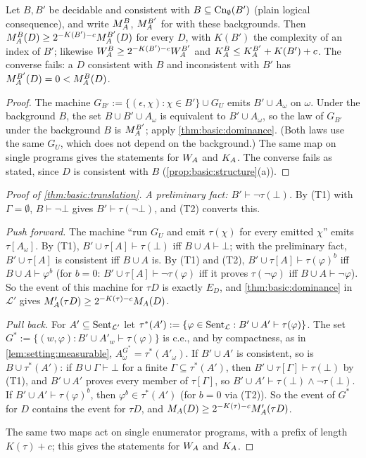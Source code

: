\begin{proposition}\label{prop:basic:background}
Let $B,B'$ be decidable and consistent with $B\subseteq\mathrm{Cn}_\emptyset(B')$ (plain logical consequence), and write $M_{A}^B$, $M_{A}^{B'}$ for \SAIabbr with these backgrounds. Then $M_{A}^B(D)\ge2^{-K(B')-c}M_{A}^{B'}(D)$ for every $D$, with $K(B')$ the complexity of an index of $B'$; likewise $W_{A}^B\ge2^{-K(B')-c}W_{A}^{B'}$ and $K_{A}^B\le K_{A}^{B'}+K(B')+c$. The converse fails: a $D$ consistent with $B$ and inconsistent with $B'$ has $M_{A}^{B'}(D)=0<M_{A}^B(D)$.
\end{proposition}

\begin{proof}
The machine $G_{B'}:=\{(\epsilon,\chi):\chi\in B'\}\cup G_U$ emits $B'\cup A_\omega$ on $\omega$. Under the background $B$, the set $B\cup B'\cup A_\omega$ is equivalent to $B'\cup A_\omega$, so the law of $G_{B'}$ under the background $B$ is $M_{A}^{B'}$; apply \cref{thm:basic:dominance}. (Both laws use the same $G_U$, which does not depend on the background.) The same map on single programs gives the statements for $W_{A}$ and $K_{A}$. The converse fails as stated, since $D$ is consistent with $B$ (\cref{prop:basic:structure}(a)).
\end{proof}

\begin{proof}[Proof of \cref{thm:basic:translation}]
\emph{A preliminary fact: $B'\vdash\neg\tau(\bot)$.} By (T1) with $\Gamma=\emptyset$, $B\vdash\neg\bot$ gives $B'\vdash\tau(\neg\bot)$, and (T2) converts this.

\emph{Push forward.} The machine ``run $G_U$ and emit $\tau(\chi)$ for every emitted $\chi$'' emits $\tau[A_\omega]$. By (T1), $B'\cup\tau[A]\vdash\tau(\bot)$ iff $B\cup A\vdash\bot$; with the preliminary fact, $B'\cup\tau[A]$ is consistent iff $B\cup A$ is. By (T1) and (T2), $B'\cup\tau[A]\vdash\tau(\varphi)^b$ iff $B\cup A\vdash\varphi^b$ (for $b=0$: $B'\cup\tau[A]\vdash\neg\tau(\varphi)$ iff it proves $\tau(\neg\varphi)$ iff $B\cup A\vdash\neg\varphi$). So the event of this machine for $\tau D$ is exactly $E_D$, and \cref{thm:basic:dominance} in $\mathcal L'$ gives $M_{A}'(\tau D)\ge2^{-K(\tau)-c}M_{A}(D)$.

\emph{Pull back.} For $A'\subseteq\mathrm{Sent}_{\mathcal L'}$ let $\tau^*(A'):=\{\varphi\in\mathrm{Sent}_{\mathcal L}:B'\cup A'\vdash\tau(\varphi)\}$. The set $G^*:=\{(w,\varphi):B'\cup A'_w\vdash\tau(\varphi)\}$ is c.e., and by compactness, as in \cref{lem:setting:measurable}, $A^{G^*}_\omega=\tau^*(A'_\omega)$. If $B'\cup A'$ is consistent, so is $B\cup\tau^*(A')$: if $B\cup\Gamma\vdash\bot$ for a finite $\Gamma\subseteq\tau^*(A')$, then $B'\cup\tau[\Gamma]\vdash\tau(\bot)$ by (T1), and $B'\cup A'$ proves every member of $\tau[\Gamma]$, so $B'\cup A'\vdash\tau(\bot)\wedge\neg\tau(\bot)$. If $B'\cup A'\vdash\tau(\varphi)^b$, then $\varphi^b\in\tau^*(A')$ (for $b=0$ via (T2)). So the event of $G^*$ for $D$ contains the event for $\tau D$, and $M_{A}(D)\ge2^{-K(\tau)-c}M_{A}'(\tau D)$.

The same two maps act on single enumerator programs, with a prefix of length $K(\tau)+c$; this gives the statements for $W_{A}$ and $K_{A}$.
\end{proof}

